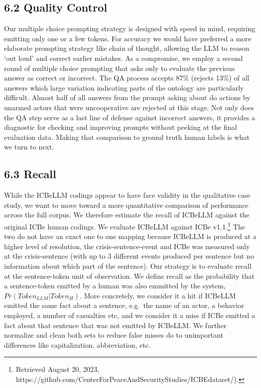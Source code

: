 \documentclass[
  letterpaper,
  DIV=11,
  numbers=noendperiod]{scrartcl}
\begin{document}
\hypertarget{quality-control}{%
\subsection{6.2 Quality Control}\label{quality-control}}

Our multiple choice prompting strategy is designed with speed in mind,
requiring emitting only one or a few tokens. For accuracy we would have
preferred a more elaborate prompting strategy like chain of thought,
allowing the LLM to reason `out loud' and correct earlier mistakes. As a
compromise, we employ a second round of multiple choice prompting that
asks only to evaluate the previous answer as correct or incorrect. The
QA process accepts 87\% (rejects 13\%) of all answers which large
variation indicating parts of the ontology are particularly difficult.
Almost half of all answers from the prompt asking about do actions by
unarmed actors that were uncooperative are rejected at this stage. Not
only does the QA step serve as a last line of defense against incorrect
answers, it provides a diagnostic for checking and improving prompts
without peeking at the final evaluation data. Making that comparison to
ground truth human labels is what we turn to next.

\hypertarget{recall}{%
\subsection{6.3 Recall}\label{recall}}

While the ICBeLLM codings appear to have face validity in the
qualitative case study, we want to move toward a more quantitative
comparison of performance across the full corpus. We therefore estimate
the recall of ICBeLLM against the original ICBe human codings. We
evaluate ICBeLLM against ICBe v1.1.\footnote{Retrieved August 20, 2023,
  https://github.com/CenterForPeaceAndSecurityStudies/ICBEdataset/).}
The two do not have an exact one to one mapping because ICBeLLM is
produced at a higher level of resolution, the crisis-sentence-event and
ICBe was measured only at the crisis-sentence (with up to 3 different
events produced per sentence but no information about which part of the
sentence). Our strategy is to evaluate recall at the sentence-token unit
of observation. We define recall as the probability that a
sentence-token emitted by a human was also emmitted by the system,
\(Pr(Token_{LLM} | Token_{H})\). More concretely, we consider it a hit
if ICBeLLM emitted the same fact about a sentence, e.g.~the name of an
actor, a behavior employed, a number of casualties etc, and we consider
it a miss if ICBe emitted a fact about that sentence that was not
emitted by ICBeLLM. We further normalize and clean both sets to reduce
false misses do to unimportant differences like capitalization,
abbreviation, etc.
\end{document}
